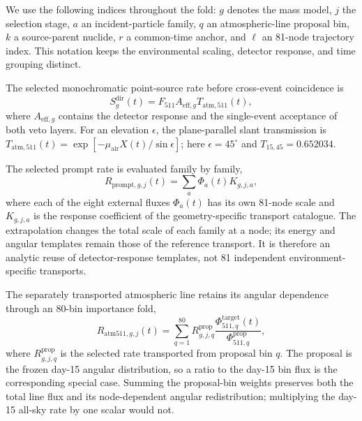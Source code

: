 \documentclass[11pt]{article}
\begin{document}
We use the following indices throughout the fold: $g$ denotes the mass model,
$j$ the selection stage, $a$ an incident-particle family, $q$ an atmospheric-line
proposal bin, $k$ a source-parent nuclide, $r$ a common-time anchor, and $\ell$
an 81-node trajectory index. This notation keeps the environmental scaling,
detector response, and time grouping distinct.

The selected monochromatic point-source rate before cross-event coincidence is
\begin{equation}
 S^{\mathrm{dir}}_g(t)=F_{511}A_{\mathrm{eff},g}T_{\mathrm{atm},511}(t),
 \label{eq:mission_signal}
\end{equation}
where $A_{\mathrm{eff},g}$ contains the detector response and the single-event
acceptance of both veto layers. For an elevation $\epsilon$, the plane-parallel
slant transmission is
$T_{\mathrm{atm},511}(t)=\exp[-\mu_{\mathrm{air}}X(t)/\sin\epsilon]$; here
$\epsilon=45^\circ$ and $T_{15,45}=0.652034$.

The selected prompt rate is evaluated family by family,
\begin{equation}
 R_{\mathrm{prompt},g,j}(t)=\sum_a\Phi_a(t)K_{g,j,a},
 \label{eq:prompt_source_response}
\end{equation}
where each of the eight external fluxes $\Phi_a(t)$ has its own 81-node scale
and $K_{g,j,a}$ is the response coefficient of the geometry-specific transport
catalogue. The extrapolation changes the total scale of each family at a node;
its energy and angular templates remain those of the reference transport. It is
therefore an analytic reuse of detector-response templates, not 81 independent
environment-specific transports.

The separately transported atmospheric line retains its angular dependence
through an 80-bin importance fold,
\begin{equation}
 R_{\mathrm{atm511},g,j}(t)=
 \sum_{q=1}^{80}R_{g,j,q}^{\mathrm{prop}}
 \frac{\Phi_{511,q}^{\mathrm{target}}(t)}{\Phi_{511,q}^{\mathrm{prop}}},
 \label{eq:mission_atm511}
\end{equation}
where $R_{g,j,q}^{\mathrm{prop}}$ is the selected rate transported from proposal
bin $q$. The proposal is the frozen day-15 angular distribution, so a ratio to
the day-15 bin flux is the corresponding special case. Summing the proposal-bin
weights preserves both the total line flux and its node-dependent angular
redistribution; multiplying the day-15 all-sky rate by one scalar would not.
\end{document}
